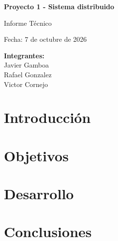 \documentclass[a4paper,12pt]{article}
\begin{document}
\begin{titlepage}
    \centering
    \vspace*{3cm}
    {\Huge\bfseries Proyecto 1 - Sistema distribuido \par}
    \vspace{2cm}
    {\Large Informe Técnico \par}
    \vspace{2cm}
    {\large Fecha: 7 de octubre de 2026 \par}
    \vspace{2cm}
    {\large
        \textbf{Integrantes:} \\
        Javier Gamboa \\
        Rafael Gonzalez \\
        Victor Cornejo
    }
    \vfill
\end{titlepage}

\tableofcontents
\newpage

\section{Introducción}

\section{Objetivos}

\section{Desarrollo}

\section{Conclusiones}
\end{document}
